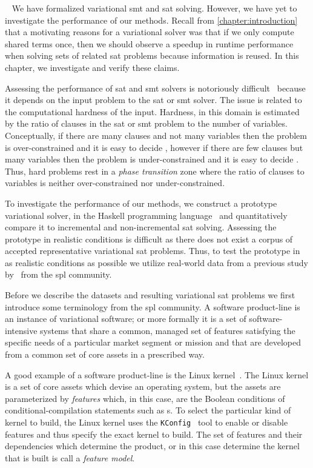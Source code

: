 ~\label{chapter:case-studies}
%
We have formalized variational \ac{smt} and \ac{sat} solving. However, we have
yet to investigate the performance of our methods. Recall from
\autoref{chapter:introduction} that a motivating reasons for a variational
solver was that if we only compute shared terms once, then we should observe a
speedup in runtime performance when solving sets of related \ac{sat} problems
because information is reused. In this chapter, we investigate and verify these
claims.

Assessing the performance of \ac{sat} and \ac{smt} solvers is notoriously
difficult~\cite{Gent94thesat} because it depends on the input problem to the
\ac{sat} or \ac{smt} solver. The issue is related to the computational hardness
of the input. Hardness, in this domain is estimated by the ratio of clauses in
the \ac{sat} or \ac{smt} problem to the number of variables. Conceptually, if
there are many clauses and not many variables then the problem is
over-constrained and it is easy to decide , however if there are few
clauses but many variables then the problem is under-constrained and it is easy
to decide . Thus, hard problems rest in a \emph{phase transition} zone
where the ratio of clauses to variables is neither over-constrained nor
under-constrained.

To investigate the performance of our methods, we construct a prototype
variational solver, \vsat{} in the Haskell programming
language~\cite{Hudak:1992:RPL:130697.130699} and quantitatively compare it to
incremental and non-incremental \ac{sat} solving. Assessing the prototype in
realistic conditions is difficult as there does not exist a corpus of accepted
representative variational \ac{sat} problems. Thus, to test the prototype in as
realistic conditions as possible we utilize real-world data from a previous
study by~\citet{NMS+:GPCE18} from the \ac{spl} community.

Before we describe the datasets and resulting variational \ac{sat} problems we
first introduce some terminology from the \ac{spl} community. A software
product-line is an instance of variational software; or
more formally it is a set of software-intensive systems that share a common,
managed set of features satisfying the specific needs of a particular market
segment or mission and that are developed from a common set of core assets in a
prescribed way.

A good example of a software product-line is the Linux kernel~\cite{linux}. The
Linux kernel is a set of core assets which devise an operating system, but the
assets are parameterized by \emph{features} which, in this case, are the Boolean
conditions of conditional-compilation statements such as s. To select
the particular kind of kernel to build, the Linux kernel uses the
\texttt{KConfig}~\cite{kconfig} tool to enable or disable features and thus
specify the exact kernel to build. The set of features and their dependencies
which determine the product, or in this case determine the kernel that is built
is call a \emph{feature model}\cite{KCHNP90}.

